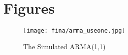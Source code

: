 \documentclass[12pt]{article}
\begin{document}
\newpage
\section{Figures}
 \begin{figure}[h!]
    \centering
    \texttt{[image: fina/arma\_useone.jpg]} 
    \caption{The Simulated ARMA(1,1)}
    \label{fig:armaone}
\end{figure}
\end{document}
